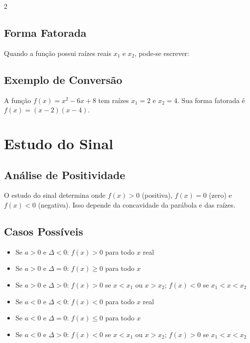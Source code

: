\documentclass[11pt]{article}
\begin{document}
\begin{multicols}{2}
\subsection*{Forma Fatorada}
Quando a função possui raízes reais $x_1$ e $x_2$, pode-se escrever:

\subsection*{Exemplo de Conversão}
A função $f(x) = x^2 - 6x + 8$ tem raízes $x_1 = 2$ e $x_2 = 4$. Sua forma fatorada é $f(x) = (x - 2)(x - 4)$.

\section*{Estudo do Sinal}

\subsection*{Análise de Positividade}
O estudo do sinal determina onde $f(x) > 0$ (positiva), $f(x) = 0$ (zero) e $f(x) < 0$ (negativa). Isso depende da concavidade da parábola e das raízes.

\subsection*{Casos Possíveis}
\begin{itemize}
\item Se $a > 0$ e $\Delta < 0$: $f(x) > 0$ para todo $x$ real
\item Se $a > 0$ e $\Delta = 0$: $f(x) \geq 0$ para todo $x$
\item Se $a > 0$ e $\Delta > 0$: $f(x) > 0$ se $x < x_1$ ou $x > x_2$; $f(x) < 0$ se $x_1 < x < x_2$
\item Se $a < 0$ e $\Delta < 0$: $f(x) < 0$ para todo $x$ real
\item Se $a < 0$ e $\Delta = 0$: $f(x) \leq 0$ para todo $x$
\item Se $a < 0$ e $\Delta > 0$: $f(x) < 0$ se $x < x_1$ ou $x > x_2$; $f(x) > 0$ se $x_1 < x < x_2$
\end{itemize}


\end{multicols}
\end{document}
